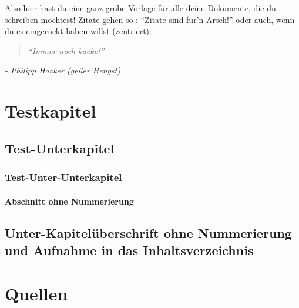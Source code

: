 \documentclass[numbers=noenddot,a4paper]{scrartcl}
\title{} %
\author{} %
\date{\today} %
\newcommand{\nummat}[1]{\left[\text{#1}\right]}
\newcommand{\num}[1]{$\left[\text{#1}\right]$}
\newcommand{\tilt}[1]{\textit{#1}}  %
\begin{document}
	
Also hier hast du eine ganz grobe Vorlage für alle deine Dokumente, die du schreiben möchtest!
Zitate gehen so :  \enquote{Zitate sind für'n Arsch!} oder auch, wenn du es eingerückt haben willst (zentriert):

	\begin{quote}
	\tilt{	\enquote{Immer noch kacke!}}
	\end{quote}
	
	\begin{flushright}
	\tilt{- Philipp Hacker (geiler Hengst)}
	\end{flushright} 


\section{Testkapitel}
\subsection{Test-Unterkapitel}
\subsubsection{Test-Unter-Unterkapitel}
\paragraph{Abschnitt ohne Nummerierung}
\subsection*{Unter-Kapitelüberschrift ohne Nummerierung und Aufnahme in das Inhaltsverzeichnis} %

\section{Quellen}

\end{document}
